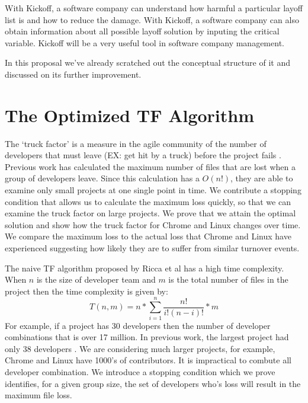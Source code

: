 \documentclass[12pt, a4paper, openright]{report}
\begin{document}
 With Kickoff, a software company can understand how harmful a particular layoff list is and how to reduce the damage. With Kickoff, a software company can also obtain information about all possible layoff solution by inputing the critical variable. Kickoff will be a very useful tool in software company management. 
 
 In this proposal we've already scratched out the conceptual structure of it and discussed on its further improvement.


\backmatter

%




\appendix
\newpage
\section*{The Optimized TF Algorithm}
The `truck factor' is a measure in the agile community of the number of developers that must leave (EX: get hit by a truck) before the project fails \cite{Torchiano2011Wetsom}. Previous work has calculated the maximum number of files
that are lost when a group of developers leave. Since this calculation has a
$O(n!)$, they are able to examine only small projects at one single point in time.
We contribute a stopping condition that allows us to calculate the maximum loss
quickly, so that we can examine the truck factor on large projects. We prove
that we attain the optimal solution and show how the truck factor for Chrome and
Linux changes over time. We compare the maximum loss to the actual loss that
Chrome and Linux have experienced suggesting how likely they are to suffer from
similar turnover events.

The naive TF algorithm proposed by Ricca et al \cite{Ricca2011PROFES} has a high time complexity.
When $n$ is the size of developer team and $m$ is the total number of files in the project then the time complexity is given by:
\begin{equation}T(n,m) = n*\sum_{i=1}^n \frac{n!}{i!(n-i)!}*m\end{equation}
For example, if a project has 30 developers then the number of developer combinations that is over 17 million.
In previous work, the largest project had only 38 developers
\cite{Torchiano2011Wetsom}. We are considering much larger projects, for
example, Chrome and Linux have 1000's of contributors. It is impractical to
combute all developer combination.
We introduce a stopping condition which we prove identifies, for a given group size, the set of developers who's loss will result in the maximum file loss.
\end{document}
